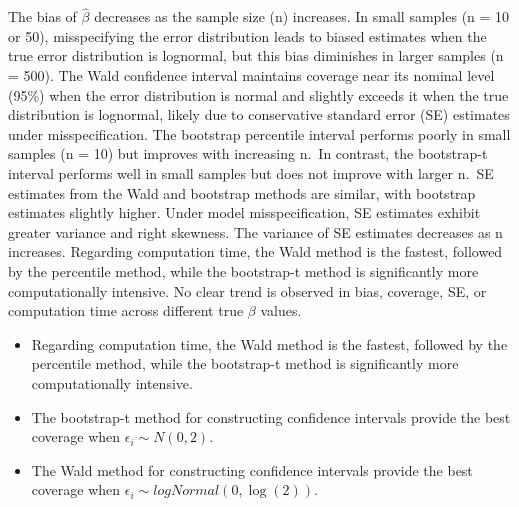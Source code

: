 \documentclass[
]{article}
\providecommand{\tightlist}{%
  \setlength{\itemsep}{0pt}\setlength{\parskip}{0pt}}
\begin{document}
The bias of \(\hat{\beta}\) decreases as the sample size (n) increases.
In small samples (n = 10 or 50), misspecifying the error distribution
leads to biased estimates when the true error distribution is lognormal,
but this bias diminishes in larger samples (n = 500). The Wald
confidence interval maintains coverage near its nominal level (95\%)
when the error distribution is normal and slightly exceeds it when the
true distribution is lognormal, likely due to conservative standard
error (SE) estimates under misspecification. The bootstrap percentile
interval performs poorly in small samples (n = 10) but improves with
increasing n.~In contrast, the bootstrap-t interval performs well in
small samples but does not improve with larger n.~SE estimates from the
Wald and bootstrap methods are similar, with bootstrap estimates
slightly higher. Under model misspecification, SE estimates exhibit
greater variance and right skewness. The variance of SE estimates
decreases as n increases. Regarding computation time, the Wald method is
the fastest, followed by the percentile method, while the bootstrap-t
method is significantly more computationally intensive. No clear trend
is observed in bias, coverage, SE, or computation time across different
true \(\beta\) values.

\begin{itemize}
\tightlist
\item
  Regarding computation time, the Wald method is the fastest, followed
  by the percentile method, while the bootstrap-t method is
  significantly more computationally intensive.
\item
  The bootstrap-t method for constructing confidence intervals provide
  the best coverage when \(\epsilon_i \sim N(0, 2)\).
\item
  The Wald method for constructing confidence intervals provide the best
  coverage when \(\epsilon_i \sim logNormal(0, \log (2))\).
\end{itemize}
\end{document}
